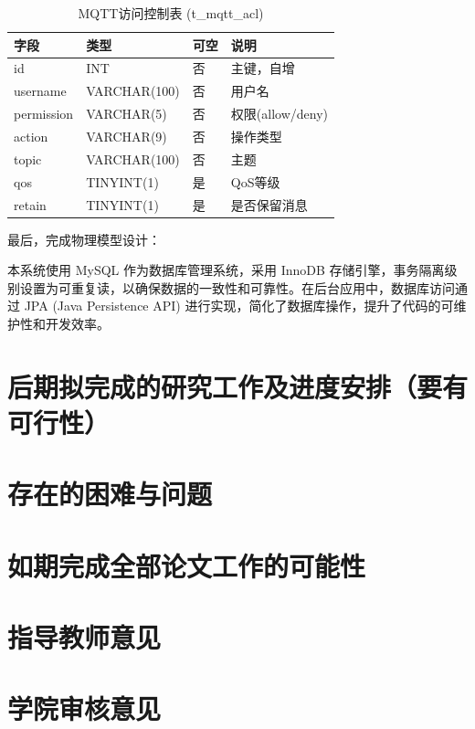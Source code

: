\documentclass{xduugmr}
\begin{document}
\begin{table}[H]
    \centering
    \caption{MQTT访问控制表 (t\_mqtt\_acl)}
    \begin{tabular}{|l|l|l|l|}
        \hline
        \textbf{字段} & \textbf{类型} & \textbf{可空} & \textbf{说明} \\
        \hline
        id & INT & 否 & 主键，自增 \\
        username & VARCHAR(100) & 否 & 用户名 \\
        permission & VARCHAR(5) & 否 & 权限(allow/deny) \\
        action & VARCHAR(9) & 否 & 操作类型 \\
        topic & VARCHAR(100) & 否 & 主题 \\
        qos & TINYINT(1) & 是 & QoS等级 \\
        retain & TINYINT(1) & 是 & 是否保留消息 \\
        \hline
    \end{tabular}
\end{table}

最后，完成物理模型设计：

本系统使用 MySQL 作为数据库管理系统，采用 InnoDB 存储引擎，事务隔离级别设置为可重复读，以确保数据的一致性和可靠性。在后台应用中，数据库访问通过 JPA (Java Persistence API) 进行实现，简化了数据库操作，提升了代码的可维护性和开发效率。



\section{后期拟完成的研究工作及进度安排（要有可行性）}
\section{存在的困难与问题}
\section{如期完成全部论文工作的可能性}
\section{指导教师意见}
\section{学院审核意见}
\end{document}
